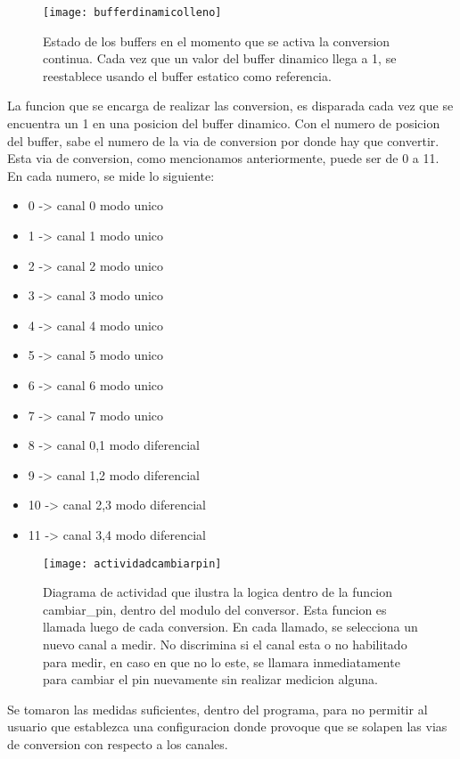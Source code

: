 \begin{figure}[h]
  \centering
  \texttt{[image: bufferdinamicolleno]}
  \caption{Estado de los buffers en el momento que se activa la conversion continua. Cada vez que un valor del buffer dinamico llega a 1, se reestablece usando el buffer estatico como referencia.}\label{fig:bufferdinamicolleno}
\end{figure}

La funcion que se encarga de realizar las conversion, es disparada cada vez que se encuentra un 1 en una posicion del buffer dinamico. Con el numero de posicion del buffer, sabe el numero de la via de conversion por donde hay que convertir. Esta via de conversion, como mencionamos anteriormente, puede ser de 0 a 11. En cada numero, se mide lo siguiente:

\begin{itemize}
\item 0 -> canal 0 modo unico
\item 1 -> canal 1 modo unico
\item 2 -> canal 2 modo unico
\item 3 -> canal 3 modo unico
\item 4 -> canal 4 modo unico
\item 5 -> canal 5 modo unico
\item 6 -> canal 6 modo unico
\item 7 -> canal 7 modo unico
\item 8 -> canal 0,1 modo diferencial
\item 9 -> canal 1,2 modo diferencial
\item 10 -> canal 2,3 modo diferencial
\item 11 -> canal 3,4 modo diferencial
\end{itemize}

\begin{figure}[h]
  \centering
  \texttt{[image: actividadcambiarpin]}
  \caption{Diagrama de actividad que ilustra la logica dentro de la funcion cambiar_pin, dentro del modulo del conversor. Esta funcion es llamada luego de cada conversion. En cada llamado, se selecciona un nuevo canal a medir. No discrimina si el canal esta o no habilitado para medir, en caso en que no lo este, se llamara inmediatamente para cambiar el pin nuevamente sin realizar medicion alguna.}\label{fig:actividadcambiarpin}
\end{figure}

Se tomaron las medidas suficientes, dentro del programa, para no permitir al usuario que establezca una configuracion donde provoque que se solapen las vias de conversion con respecto a los canales. 

